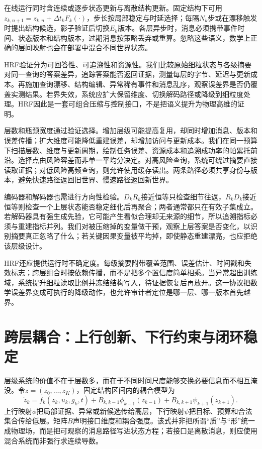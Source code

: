 在线运行同时含连续或逐步状态更新与离散结构更新。固定结构下可用$z_{k,n+1}=z_{k,n}+\Delta t_kF_k(\cdot)$，步长按局部稳定与时延选择；每隔$N_k$步或在漂移触发时提出结构候选，影子验证后切换$E_k$版本。各层异步时，消息必须携带事件时间、状态版本和结构版本，过期消息按策略丢弃或重算。忽略这些语义，数学上正确的层间映射也会在部署中混合不同世界状态。

HRF验证分为可回答性、可追溯性和资源性。我们比较原始细粒状态与各级摘要对同一查询的答案差异，追踪答案能否返回证据，测量每层的字节、延迟与更新成本。再施加查询漂移、结构编辑、异常稀有事件和消息乱序，观察误差界是否仍覆盖实测结果。若界失效，系统应扩大保留维度、切换解码路径或降级到细粒度处理。HRF因此是一套可组合压缩与控制接口，不是把语义提升为物理高维的证明。

层数和瓶颈宽度通过验证选择。增加层级可能提高复用，却同时增加消息、版本和误差传播；扩大维度可能降低重建误差，却增加访问与更新成本。我们在同一预算下扫描层数、维度与更新周期，绘制任务误差、资源成本和追溯成功率的帕累托前沿。选择点由风险容差而非单一平均分决定。对高风险查询，系统可绕过摘要直接读取证据；对低风险高频查询，则允许使用缓存读出。两条路径必须共享身份与版本，避免快速路径返回旧世界、慢速路径返回新世界。

编码器和解码器也需进行方向性检验。$D_kR_k$接近恒等只检查细节往返，$R_kD_k$接近恒等则检查一个上层状态能否稳定细化后再聚合；两者通常都只在有效子集成立。若解码器具有强生成先验，它可能产生看似合理却无来源的细节，所以追溯指标必须与重建指标并列。我们对被压缩掉的变量做干预，观察上层答案是否变化，以识别摘要真正忽略了什么；若关键因果变量被平均掉，即使静态重建漂亮，也应拒绝该层级设计。

HRF还应提供运行时不确定度。每级摘要附带覆盖范围、误差估计、时间戳和失效标志；跨层组合时按依赖传播，而不是把多个置信度简单相乘。当异常超出训练域，系统提升细粒读取比例并冻结结构写入，待证据恢复后再放开。这一协议把数学误差界变成可执行的降级动作，也允许审计者定位是哪一层、哪一版本首先越界。

\section{跨层耦合：上行创新、下行约束与闭环稳定}
\label{sec:hierarchical_flow_unification}

层级系统的价值不在于层数多，而在于不同时间尺度能够交换必要信息而不相互淹没。令$z=(z_0,\ldots,z_K)$，固定结构区间内的耦合模型为
\begin{equation}
 \dot z_k=f_k(z_k,u_k,g_k,t)+B_{k,k-1}\phi_{k-1}(z_{k-1})+B_{k,k+1}\psi_{k+1}(z_{k+1}).
\end{equation}
上行映射$\phi$把局部证据、异常或新候选传给高层，下行映射$\psi$把目标、预算和合法集合传给低层。矩阵$B$声明接口维度和耦合强度。该式并非把所谓“质”与“形”统一成物理场，而是把可观察的消息路径写进状态方程；若接口是离散消息，则应使用混合系统而非强行求连续导数。

